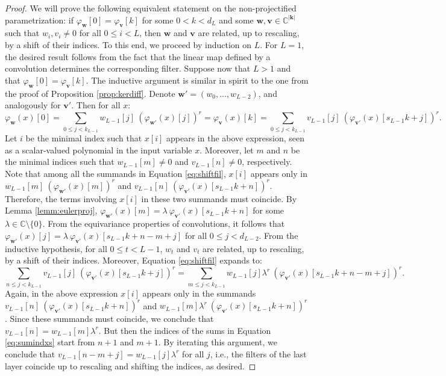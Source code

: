 \documentclass[twoside]{article}
\theoremstyle{plain}%
\theoremstyle{definition}
\theoremstyle{remark}
\begin{document}
\begin{proof}
We will prove the following equivalent statement on the non-projectified parametrization: if $\varphi_\mathbf{w}[0] = \varphi_\mathbf{v}[k]$ for some $0 < k < d_L$ and some $\mathbf{w}, \mathbf{v} \in \mathbb{C}^{|\mathbf{k}|}$ such that $w_i, v_i \not = 0$ for all $0 \leq i < L$, then $\mathbf{w}$ and $\mathbf{v}$ are related, up to rescaling, by a shift of their indices. To this end, we proceed by induction on $L$. For $L = 1$, the desired result follows from the fact that the linear map defined by a convolution determines the corresponding filter. Suppose now that $L > 1$ and that $\varphi_\mathbf{w}[0] = \varphi_\mathbf{v}[k]$. The inductive argument is similar in spirit to the one from the proof of Proposition \ref{prop:kerdiff}. Denote  $\mathbf{w}' = (w_{0}, \ldots, w_{L-2})$, and analogously for $\mathbf{v}'$. Then for all $x$: 
\begin{equation}\label{eq:shiftfil}
\varphi_\mathbf{w}(x)[0] = \sum_{0 \leq j < k_{L-1}} w_{L-1}[j]\ (\varphi_{\mathbf{w}'}(x)[j])^r = \varphi_\mathbf{v}(x)[k] = \sum_{0 \leq j < k_{L-1}} v_{L-1}[j]\ (\varphi_{\mathbf{v}'}(x)[s_{L-1}k + j])^r. 
\end{equation}
Let $i$ be the minimal index such that $x[i]$ appears in the above expression, seen as a scalar-valued polynomial in the input variable $x$. Moreover, let $m$ and $n$ be the minimal indices such that $w_{L-1}[m] \not = 0$ and $v_{L-1}[n] \not = 0$, respectively. Note that among all the summands in Equation \ref{eq:shiftfil}, $x[i]$ appears only in $w_{L-1}[m] \ (\varphi_{\mathbf{w}'}(x)[m])^r $ and $v_{L-1}[n] \ (\varphi_{\mathbf{v}'}(x)[s_{L-1}k + n])^r$. Therefore, the terms involving $x[i]$ in these two summands must coincide. By Lemma \ref{lemm:eulerproj}, $\varphi_{\mathbf{w}'}(x)[m] = \lambda \ \varphi_{\mathbf{v}'}(x)[s_{L-1}k + n]$ for some $\lambda \in \mathbb{C} \setminus \{ 0\}$. From the equivariance properties of convolutions, it follows that $\varphi_{\mathbf{w}'}(x)[j] = \lambda \ \varphi_{\mathbf{v}'}(x)[s_{L-1}k + n - m + j]$ for all $0 \leq j < d_{L-2}$. From the inductive hypothesis, for all $0\leq t < L-1$, $w_t$ and $v_t$ are related, up to rescaling, by a shift of their indices.  Moreover, Equation \ref{eq:shiftfil} expands to:
\begin{equation}\label{eq:sumindxs}
\sum_{n \leq j < k_{L-1}} v_{L-1}[j] \ (\varphi_{\mathbf{v}'}(x)[s_{L-1}k + j])^r = \sum_{m \leq j < k_{L-1}} w_{L-1}[j] \lambda^r \  (\varphi_{\mathbf{v}'}(x)[s_{L-1}k + n - m + j])^r.
\end{equation}
Again, in the above expression $x[i]$ appears only in the summands $v_{L-1}[n]\ (\varphi_{\mathbf{v}'}(x)[s_{L-1}k + n])^r $ and $w_{L-1}[m] \lambda^r \  (\varphi_{\mathbf{v}'}(x)[s_{L-1}k + n])^r$. Since these summands must coincide, we conclude that $v_{L-1}[n] = w_{L-1}[m]\lambda^r$. But then the indices of the sums in Equation \ref{eq:sumindxs} start from $n+1$ and $m+1$. By iterating this argument, we conclude that $v_{L-1}[n - m + j] = w_{L-1}[j]\lambda^r$ for all $j$, i.e., the filters of the last layer coincide up to rescaling and shifting the indices, as desired. 


\end{proof}
\end{document}
